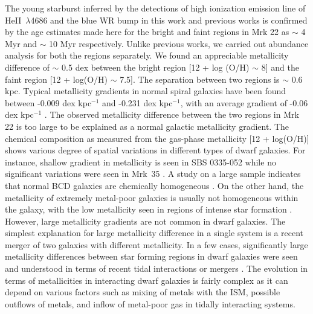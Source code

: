 \documentclass[useAMS,usenatbib]{mn2e}
\begin{document}
The young starburst inferred by the detections of high ionization emission line of He{\small{II}}~$\lambda$4686 and the blue WR bump in this work and previous works \citep{2000ApJ...531..776G,2008A&A...485..657B} is confirmed by the age estimates made here for the bright and faint regions in Mrk 22 as $\sim$ 4 Myr and $\sim$ 10 Myr respectively. Unlike previous works, we carried out abundance analysis for both the regions separately. We found an appreciable metallicity difference of $\sim$ 0.5 dex between the bright region [12 + log (O/H) $\sim$ 8] and the faint region [12 + log(O/H) $\sim$ 7.5]. The separation between two regions is $\sim$ 0.6 kpc. Typical metallicity gradients in normal spiral galaxies have been found between -0.009 dex kpc$^{-1}$ and -0.231 dex kpc$^{-1}$, with an average gradient of -0.06 dex kpc$^{-1}$ \citep{1994ApJ...420...87Z}. The observed metallicity difference between the two regions in Mrk  22 is too large to be explained as a normal galactic metallicity gradient. The  chemical composition as measured from the gas-phase metallicity [12 + log(O/H)] shows various degree of spatial variations in different types of dwarf galaxies. For instance, shallow gradient in metallicity is seen in SBS 0335-052 \citep{2006A&A...454..119P} while no significant variations were seen in Mrk~35 \citep{2007ApJ...669..251C}. A study on a large sample indicates that normal BCD galaxies are chemically homogeneous \citep{1996ApJ...471..211K,2006A&A...454..119P,2008A&A...477..813K,2009ApJ...707.1676C,2009MNRAS.398..949P,
2011MNRAS.412..675P,2011MNRAS.414..272H,2012MNRAS.423..406G,2013AdAst2013E..20L}. On the other hand, the metallicity of extremely metal-poor galaxies is usually not homogeneous within the galaxy, with the low metallicity seen in regions of intense star formation \citep{2006A&A...454..119P,2009ApJ...690.1797I,2011ApJ...739...23L,2013ApJ...767...74S,2014ApJ...783...45S,
2015ApJ...810L..15S}. However, large metallicity gradients are not common in dwarf galaxies. The simplest explanation for large metallicity difference in a single system is a recent merger of two galaxies with different metallicity. In a few cases, significantly large metallicity differences between star forming regions in dwarf galaxies were seen and understood in terms of recent tidal interactions or mergers \citep{2004A&A...428..425L,2004ApJS..153..243L,2006A&A...449..997L,2009A&A...508..615L,2010A&A...517A..85L}. The evolution in terms of metallicities in interacting dwarf galaxies is fairly complex as it can depend on various factors such as mixing of metals with the ISM, possible outflows of metals, and inflow of metal-poor gas in tidally interacting systems. 
\end{document}

